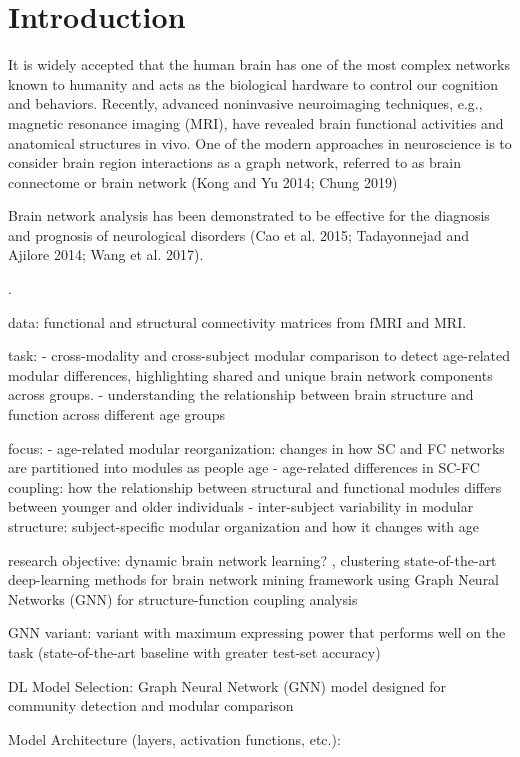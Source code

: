
\section{Introduction}
It is widely accepted that the human brain has one of the
most complex networks known to humanity and acts as the
biological hardware to control our cognition and behaviors.
Recently, advanced noninvasive neuroimaging techniques,
e.g., magnetic resonance imaging (MRI), have revealed
brain functional activities and anatomical structures in
vivo. One of the modern approaches in neuroscience is
to consider brain region interactions as a graph network,
referred to as brain connectome or brain network (Kong and
Yu 2014; Chung 2019) 

Brain network analysis has been
demonstrated to be effective for the diagnosis and prognosis
of neurological disorders (Cao et al. 2015; Tadayonnejad
and Ajilore 2014; Wang et al. 2017).



\cite{Zhang2022}.


data: functional and structural connectivity matrices from fMRI and MRI. 

task: 
- cross-modality and cross-subject modular comparison 
to detect age-related modular differences, highlighting shared 
and unique brain network components across groups. 
-  understanding the relationship between brain structure and function 
across different age groups

focus: 
- age-related modular reorganization: changes in how SC and FC networks are partitioned 
    into modules as people age
- age-related differences in SC-FC coupling: how the relationship between structural and 
    functional modules differs between younger and older individuals
- inter-subject variability in modular structure: subject-specific modular organization 
    and how it changes with age
\cite{Puxeddu2022}

research objective: 
dynamic brain network learning? \cite{Tang2023}, 
clustering
state-of-the-art deep-learning methods for brain network mining
framework using Graph Neural Networks (GNN) for structure-function coupling analysis

GNN variant: variant with maximum expressing power that performs
well on the task (state-of-the-art baseline with greater test-set
accuracy)

DL Model Selection: Graph Neural Network (GNN) model designed for 
community detection and modular comparison

Model Architecture (layers, activation functions, etc.):



